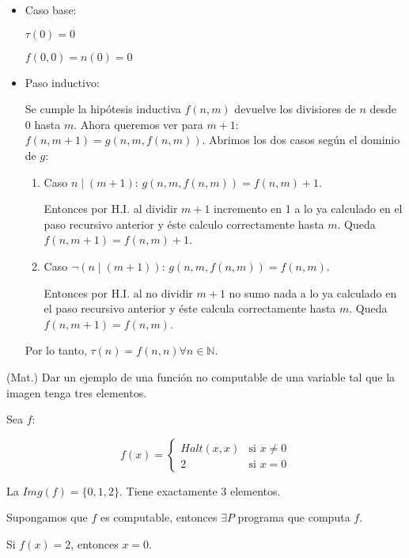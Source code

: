 \begin{questions}
\begin{solution}
\begin{itemize}
 \item Caso base: 
 
 $\tau(0) = 0$
 
 $f(0,0) = n(0) = 0$ 
 
 \item Paso inductivo: 
 
 Se cumple la hipótesis inductiva $f(n,m)$ devuelve los divisiores de $n$ desde $0$ hasta $m$. Ahora queremos ver para $m+1$: $f(n,m+1) = g(n,m,f(n,m))$. Abrimos los dos casos seg\'un el dominio de $g$: 
 
  \begin{enumerate}[1.]
   \item Caso $n \mid (m+1)$: $g(n,m,f(n,m)) = f(n,m)+1$. 
   
    Entonces por H.I. al dividir $m+1$ incremento en 1 a lo ya calculado en el paso recursivo anterior y éste calculo correctamente hasta $m$. Queda $f(n,m+1)=f(n,m)+1$.
    
   \item Caso $\neg (n \mid (m+1))$: $g(n,m,f(n,m)) = f(n,m)$. 
   
    Entonces por H.I. al no dividir $m+1$ no sumo nada a lo ya calculado en el paso recursivo anterior y éste calcula correctamente hasta $m$. Queda $f(n,m+1)=f(n,m)$.
  \end{enumerate}

 Por lo tanto, $\tau(n) = f(n,n) \forall n \in \mathbb{N}$.
 
\end{itemize}

\end{solution} 

\question (Mat.) Dar un ejemplo de una funci\'on no computable de una variable tal que la imagen tenga tres elementos. 

\begin{solution}
Sea $f$: 

$$
f(x) = \left\{
\begin{array}{cl}
Halt(x,x) & \mbox{si } x \neq 0 \\
2 & \mbox{si } x = 0
\end{array}\right.
$$

La $Img(f) = \{0,1,2\}$. Tiene exactamente 3 elementos.

Supongamos que $f$ es computable, entonces $\exists P$ programa que computa $f$. 

Si $f(x) = 2$, entonces $x = 0$. 


\end{solution}
\end{questions}
